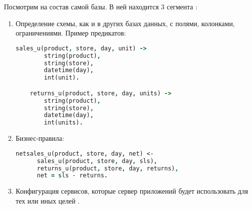 Посмотрим на состав самой базы. В ней находится 3 сегмента \cite{lb_db_overview}:

\begin{enumerate}
	\item Определение схемы, как и в других базах данных, с полями, колонками, ограничениями. Пример предикатов:
	\begin{lstlisting}[language=Prolog]
	sales_u(product, store, day, unit) ->
		string(product),
		string(store),
		datetime(day),
		int(unit).

	returns_u(product, store, day, units) ->
		string(product),
		string(store),
		datetime(day),
		int(units).
	\end{lstlisting}
	\item Бизнес-правила:
	\begin{lstlisting}[language=Prolog]
	netsales_u(product, store, day, net) <-
	  sales_u(product, store, day, sls),
	  returns_u(product, store, day, returns),
	  net = sls - returns.
	\end{lstlisting}
	\item Конфигурация сервисов, которые сервер приложений будет использовать для тех или иных целей \cite{query_language_for_smart_db}.
\end{enumerate}
